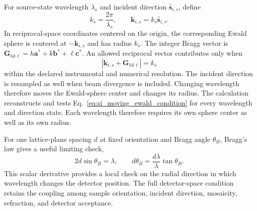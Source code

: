 For source-state wavelength $\lambda_s$ and incident direction
$\hat{\mathbf s}_{i,s}$, define
\begin{equation}
  k_s=\frac{2\pi}{\lambda_s},
  \qquad
  \mathbf k_{i,s}=k_s\hat{\mathbf s}_{i,s}.
  \label{eq:si_wavelength_sample}
\end{equation}
In reciprocal-space coordinates centered on the origin, the corresponding
Ewald sphere is centered at $-\mathbf k_{i,s}$ and has radius $k_s$.
The integer Bragg vector is $\mathbf G_{hk\ell}=h\mathbf a^*+k\mathbf b^*+\ell\mathbf c^*$. An allowed reciprocal vector contributes only when
\begin{equation}
  \left|\mathbf k_{i,s}+\mathbf G_{hk\ell}\right|=k_s
  \label{eq:si_moving_ewald_condition}
\end{equation}
within the declared instrumental and numerical resolution.\cite{AlsNielsenMcMorrow2001}
The incident direction is resampled as well when beam divergence is included.
Changing wavelength therefore moves the Ewald-sphere center and changes its
radius. The calculation reconstructs and tests Eq.~\eqref{eq:si_moving_ewald_condition}
for every wavelength and direction state. Each wavelength therefore requires its own sphere center as well as its own radius.

For one lattice-plane spacing $d$ at fixed orientation and Bragg angle $\theta_B$, Bragg's law gives a useful
limiting check,
\begin{equation}
  2d\sin\theta_B=\lambda,
  \qquad
  d\theta_B=\frac{d\lambda}{\lambda}\tan\theta_B.
  \label{eq:si_bragg_bandwidth_check}
\end{equation}
This scalar derivative provides a local check on the radial direction in which wavelength changes the detector position. The full detector-space condition retains the coupling among sample orientation, incident direction, mosaicity, refraction, and detector acceptance.
